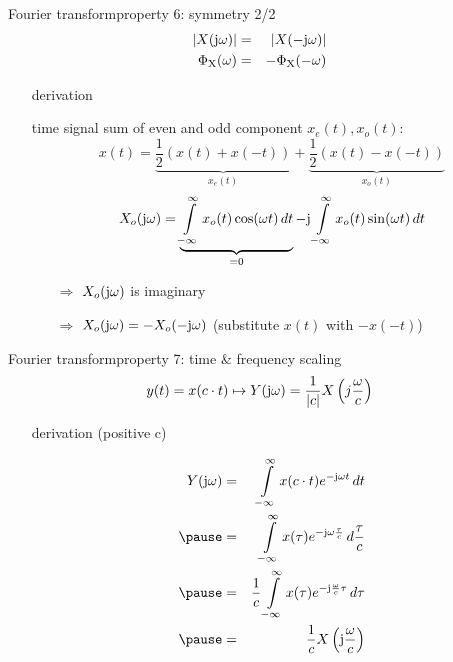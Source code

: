 	\begin{frame}{Fourier transform}{property 6: symmetry 2/2}
		\begin{eqnarray*}
			|X(\mathrm{j}\omega)| &=& |X(-\mathrm{j}\omega)|\\
			\Phi_\mathrm{X}(\omega) &=& -\Phi_\mathrm{X}(-\omega) 
		\end{eqnarray*}
		\pause
		\vspace{-5mm}
		\begin{itemize}
			\item[]	derivation
			
			\begin{footnotesize}
				time signal sum of even and odd component $x_e(t), x_o(t)$:
				\begin{equation*}
					x(t) = \underbrace{\frac{1}{2}(x(t) + x(-t))}_{x_e(t)} + \underbrace{\frac{1}{2}(x(t) - x(-t))}_{x_o(t)} 
				\end{equation*}
				\pause
				\begin{equation*}
					X_o(\mathrm{j}\omega) = \underbrace{\int\limits_{-\infty}^{\infty}{x_o(t)\cos(\omega t)\,dt}}_{=0} - \mathrm{j} \int\limits_{-\infty}^{\infty}{x_o(t)\sin(\omega t)\,dt} \nonumber
				\end{equation*}
				\pause
		\vspace{-5mm}
				\begin{itemize}
					\item[$\Rightarrow$]	$X_o(\mathrm{j}\omega)$ is imaginary
					\item[$\Rightarrow$]	$X_o(\mathrm{j}\omega) = -X_o(-\mathrm{j}\omega)$ (substitute $x(t)$ with $-x(-t)$)
				\end{itemize}
			\end{footnotesize}
		\end{itemize}
	\end{frame}	

	\begin{frame}{Fourier transform}{property 7: time \& frequency scaling}
				\begin{equation*}
					y(t) = x(c\cdot t) \mapsto Y(\mathrm{j}\omega) = \frac{1}{|c|}X\left(j\frac{\omega}{c}\right) 
				\end{equation*}
		\pause
		\begin{itemize}
			\item[]	derivation (positive c)
			\begin{footnotesize}
				\begin{eqnarray*}
					Y(\jom) &=& \int\limits_{-\infty}^{\infty} {x(c\cdot t) \e^{-\jom t}\, dt}\nonumber\\
					\pause
					&=& \int\limits_{-\infty}^{\infty} {x(\tau) \e^{-\jom \frac{\tau}{c}}\, d\frac{\tau}{c}}\nonumber\\
					\pause
					&=& \frac{1}{c}\int\limits_{-\infty}^{\infty} {x(\tau) \e^{-\mathrm{j} \frac{\omega}{c} \tau}\, d\tau}\nonumber\\
					\pause
					&=& \frac{1}{c} X\left(\mathrm{j}\frac{\omega}{c}\right) \nonumber
				\end{eqnarray*}
			\end{footnotesize}
		\end{itemize}
	\end{frame}	

